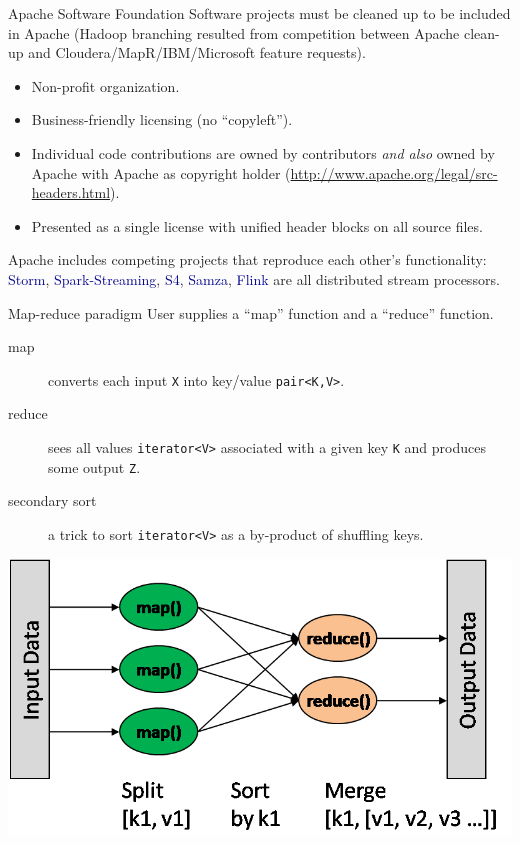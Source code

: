 \documentclass{beamer}
\begin{document}
\begin{frame}{Apache Software Foundation}
Software projects must be cleaned up to be included in Apache (Hadoop branching resulted from competition between Apache clean-up and Cloudera/MapR/IBM/Microsoft feature requests).

\begin{itemize}
\item Non-profit organization.
\item Business-friendly licensing (no ``copyleft'').
\item Individual code contributions are owned by contributors {\it and also} owned by Apache with Apache as copyright holder (\url{http://www.apache.org/legal/src-headers.html}).
\item Presented as a single license with unified header blocks on all source files.
\end{itemize}

Apache includes competing projects that reproduce each other's functionality: \textcolor{darkblue}{Storm}, \textcolor{darkblue}{Spark-Streaming}, \textcolor{darkblue}{S4}, \textcolor{darkblue}{Samza}, \textcolor{darkblue}{Flink} are all distributed stream processors.
\end{frame}

\begin{frame}{Map-reduce paradigm}
User supplies a ``map'' function and a ``reduce'' function.
\begin{description}
\item[map] converts each input {\tt X} into key/value {\tt pair<K,V>}.
\item[reduce] sees all values {\tt iterator<V>} associated with a given key {\tt K} and produces some output {\tt Z}.
\item[secondary sort] a trick to sort {\tt iterator<V>} as a by-product of shuffling keys.
\end{description}

\begin{center}
\includegraphics[width=0.65\linewidth]{map-reduce.png}
\end{center}
\end{frame}
\end{document}
